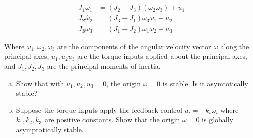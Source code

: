 \documentclass[11pt]{article}
\begin{document}
\begin{align*}
    J_1 \dot{\omega_1} &= (J_2 - J_3)(\omega_2\omega_3) + u_1\\
    J_2 \dot{\omega_2} &= (J_3 - J_1)\omega_3\omega_1 + u_2\\
    J_3 \dot{\omega_3} &= (J_1 - J_2)\omega_1\omega_2 + u_3
\end{align*}

Where $\omega_1,\omega_2,\omega_3$ are the components of the angular velocity vector $\omega$ along the principal
axes, $u_1, u_2 u_3$ are the torque inputs applied about the principal axes, and $J_1, J_2, J_3$
are the principal moments of inertia.
\begin{enumerate}[(a)]
    \item Show that with $u_1, u_2, u_3 = 0$, the origin $\omega = 0$ is stable. Is it asymtotically stable?
    \item Suppose the torque inputs apply the feedback control $u_i = -k_i\omega_i$
    where $k_1, k_2, k_3$ are positive constants. Show that the origin $\omega = 0$ is globally
    asymptotically stable.
\end{enumerate}

\soln
\end{document}
